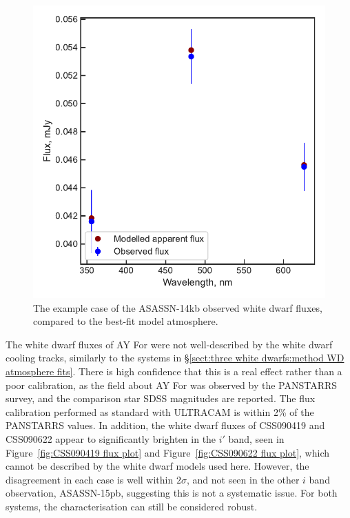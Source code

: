 \begin{figure}
    \centering
    \includegraphics[width=\textwidth]{figures/results/ASASSN-14kb/fluxplot.pdf}
    \caption{The example case of the ASASSN-14kb observed white dwarf fluxes, compared to the best-fit model atmosphere.}
    \label{fig:results:12 new CVs:ASASSN-14kb flux plot}
\end{figure}

The white dwarf fluxes of AY For were not well-described by the white dwarf cooling tracks, similarly to the systems in \S\ref{sect:three white dwarfs:method WD atmosphere fits}. There is high confidence that this is a real effect rather than a poor calibration, as the field about AY For was observed by the PANSTARRS survey, and the comparison star SDSS magnitudes are reported. The flux calibration performed as standard with ULTRACAM is within 2\% of the PANSTARRS values.
In addition, the white dwarf fluxes of CSS090419 and CSS090622 appear to significantly brighten in the $i'$ band, seen in Figure~\ref{fig:CSS090419 flux plot} and Figure~\ref{fig:CSS090622 flux plot}, which cannot be described by the white dwarf models used here. However, the disagreement in each case is well within $2 \sigma$, and not seen in the other $i$ band observation, ASASSN-15pb, suggesting this is not a systematic issue. For both systems, the characterisation can still be considered robust.

